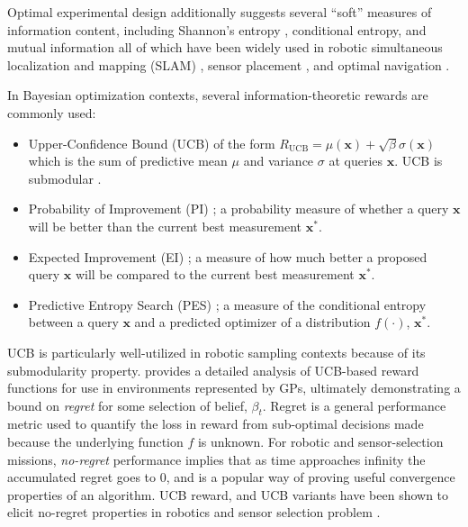 Optimal experimental design additionally suggests several ``soft'' measures of information content, including Shannon's entropy \autocite{shannon1998mathematical}, conditional entropy, and mutual information all of which have been widely used in robotic simultaneous localization and mapping (SLAM) \autocite{burgard1997active, carrillo2015autonomous, bourgault2002information, valencia2018active}, sensor placement \autocite{guestrin2005near, papadimitriou2000entropy, Krause2008}, and optimal navigation \autocite{daniel2012hierarchical}.

In Bayesian optimization contexts, several information-theoretic rewards are commonly used:

\begin{itemize}
    \item Upper-Confidence Bound (UCB)\autocite{agrawal1995sample,auer2002using,snoek2012practical} of the form $R_{\text{UCB}} = \mu(\mathbf{x}) + \sqrt{\beta}\sigma(\mathbf{x})$ which is the sum of predictive mean $\mu$ and variance $\sigma$ at queries $\mathbf{x}$. UCB is submodular \autocite{nemhauser1978analysis}.
    \item Probability of Improvement (PI) \autocite{snoek2012practical,kushner1964new}; a probability measure of whether a query $\mathbf{x}$ will be better than the current best measurement $\mathbf{x}^*$.
    \item Expected Improvement (EI) \autocite{snoek2012practical,jones1998efficient}; a measure of how much better a proposed query $\mathbf{x}$ will be compared to the current best measurement $\mathbf{x}^*$.
    \item Predictive Entropy Search (PES) \autocite{hennig2012entropy,hernandez2014predictive}; a measure of the conditional entropy between a query $\mathbf{x}$ and a predicted optimizer of a distribution $f(\cdot)$, $\mathbf{x}^*$.
\end{itemize} 

UCB is particularly well-utilized in robotic sampling contexts because of its submodularity property.
\cite{Srinivas2012} provides a detailed analysis of UCB-based reward functions for use in environments represented by GPs, ultimately demonstrating a bound on \emph{regret} for some selection of belief, $\beta_t$.
Regret is a general performance metric used to quantify the loss in reward from sub-optimal decisions made because the underlying function $f$ is unknown.
For robotic and sensor-selection missions, \emph{no-regret} performance implies that as time approaches infinity the accumulated regret goes to 0, and is a popular way of proving useful convergence properties of an algorithm.
UCB reward, and UCB variants have been shown to elicit no-regret properties in robotics and sensor selection problem \autocite{Sun2017,Srinivas2012,garivier2011kl}.


